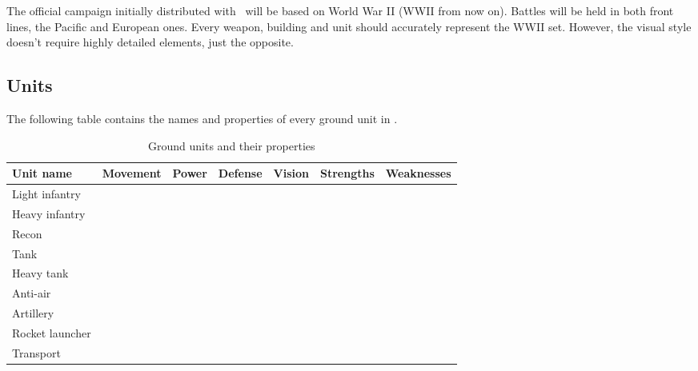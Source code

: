The official campaign initially distributed with \game\ will be based on World
War II (WWII from now on). Battles will be held in both front lines, the Pacific
and European ones. Every weapon, building and unit should accurately represent
the WWII set. However, the visual style doesn't require highly detailed
elements, just the opposite.\\

\subsection{Units}


The following table contains the names and properties of every ground unit in
\game.\\

\begin{table}[H]
    \label{tab:ground-units}
    \begin{center}
    \begin{tabular}{| l | m{1.7cm} | m{1.7cm} | m{1.7cm} | m{1.7cm} | m{2.75cm} | m{2.75cm} |}
        \hline
        \textbf{Unit name} & \textbf{Movement} & \textbf{Power} & \textbf{Defense} & \textbf{Vision} & \textbf{Strengths} & \textbf{Weaknesses} \\
        \hline
        Light infantry &  &  &  &  &  &  \\
        \hline
        Heavy infantry &  &  &  &  &  &  \\
        \hline
        Recon &  &  &  &  &  &  \\
        \hline
        Tank &  &  &  &  &  &  \\
        \hline
        Heavy tank &  &  &  &  &  &  \\
        \hline
        Anti-air &  &  &  &  &  &  \\
        \hline
        Artillery &  &  &  &  &  &  \\
        \hline
        Rocket launcher &  &  &  &  &  &  \\
        \hline
        Transport &  &  &  &  &  &  \\
        \hline
    \end{tabular}
    \end{center}
\caption{Ground units and their properties}
\end{table}

